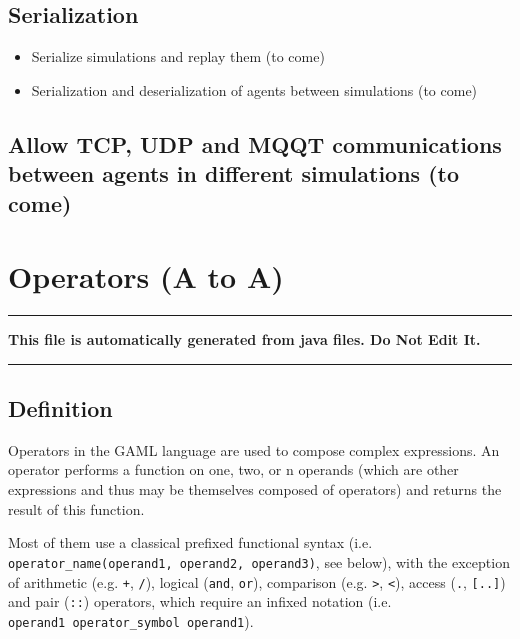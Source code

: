 \documentclass[]{book}
\providecommand{\tightlist}{%
  \setlength{\itemsep}{0pt}\setlength{\parskip}{0pt}}
\theoremstyle{definition}
\theoremstyle{definition}
\theoremstyle{definition}
\theoremstyle{remark}
\begin{document}
\section{Serialization}\label{serialization}

\begin{itemize}
\tightlist
\item
  Serialize simulations and replay them (to come)
\item
  Serialization and deserialization of agents between simulations (to
  come)
\end{itemize}

\section{Allow TCP, UDP and MQQT communications between agents in
different simulations (to
come)}\label{allow-tcp-udp-and-mqqt-communications-between-agents-in-different-simulations-to-come}

\chapter{Operators (A to A)}\label{operators-a-to-a}

\begin{center}\rule{0.5\linewidth}{\linethickness}\end{center}

\textbf{This file is automatically generated from java files. Do Not
Edit It.}

\begin{center}\rule{0.5\linewidth}{\linethickness}\end{center}

\section{Definition}\label{definition}

Operators in the GAML language are used to compose complex expressions.
An operator performs a function on one, two, or n operands (which are
other expressions and thus may be themselves composed of operators) and
returns the result of this function.

Most of them use a classical prefixed functional syntax (i.e.
\texttt{operator\_name(operand1,\ operand2,\ operand3)}, see below),
with the exception of arithmetic (e.g. \texttt{+}, \texttt{/}), logical
(\texttt{and}, \texttt{or}), comparison (e.g. \texttt{\textgreater{}},
\texttt{\textless{}}), access (\texttt{.}, \texttt{{[}..{]}}) and pair
(\texttt{::}) operators, which require an infixed notation (i.e.
\texttt{operand1\ operator\_symbol\ operand1}).
\end{document}
